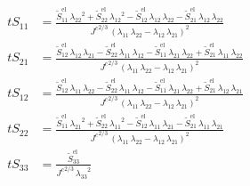 \begin{align}
tS_{11} &= \frac{\tilde{S}_{11}^{\mathrm{el}}\,{\lambda _{22}}^2+\tilde{S}_{22}^{\mathrm{el}}\,{\lambda _{12}}^2-\tilde{S}_{12}^{\mathrm{el}}\,\lambda _{12}\,\lambda _{22}-\tilde{S}_{21}^{\mathrm{el}}\,\lambda _{12}\,\lambda _{22}}{{J^{c}}^{2/3}\,{\left(\lambda _{11}\,\lambda _{22}-\lambda _{12}\,\lambda _{21}\right)}^2} \\ 
tS_{21} &= \frac{\tilde{S}_{12}^{\mathrm{el}}\,\lambda _{12}\,\lambda _{21}-\tilde{S}_{22}^{\mathrm{el}}\,\lambda _{11}\,\lambda _{12}-\tilde{S}_{11}^{\mathrm{el}}\,\lambda _{21}\,\lambda _{22}+\tilde{S}_{21}^{\mathrm{el}}\,\lambda _{11}\,\lambda _{22}}{{J^{c}}^{2/3}\,{\left(\lambda _{11}\,\lambda _{22}-\lambda _{12}\,\lambda _{21}\right)}^2} \\ 
tS_{12} &= \frac{\tilde{S}_{12}^{\mathrm{el}}\,\lambda _{11}\,\lambda _{22}-\tilde{S}_{22}^{\mathrm{el}}\,\lambda _{11}\,\lambda _{12}-\tilde{S}_{11}^{\mathrm{el}}\,\lambda _{21}\,\lambda _{22}+\tilde{S}_{21}^{\mathrm{el}}\,\lambda _{12}\,\lambda _{21}}{{J^{c}}^{2/3}\,{\left(\lambda _{11}\,\lambda _{22}-\lambda _{12}\,\lambda _{21}\right)}^2} \\ 
tS_{22} &= \frac{\tilde{S}_{11}^{\mathrm{el}}\,{\lambda _{21}}^2+\tilde{S}_{22}^{\mathrm{el}}\,{\lambda _{11}}^2-\tilde{S}_{12}^{\mathrm{el}}\,\lambda _{11}\,\lambda _{21}-\tilde{S}_{21}^{\mathrm{el}}\,\lambda _{11}\,\lambda _{21}}{{J^{c}}^{2/3}\,{\left(\lambda _{11}\,\lambda _{22}-\lambda _{12}\,\lambda _{21}\right)}^2} \\ 
tS_{33} &= \frac{\tilde{S}_{33}^{\mathrm{el}}}{{J^{c}}^{2/3}\,{\lambda _{33}}^2} 
\end{align}
